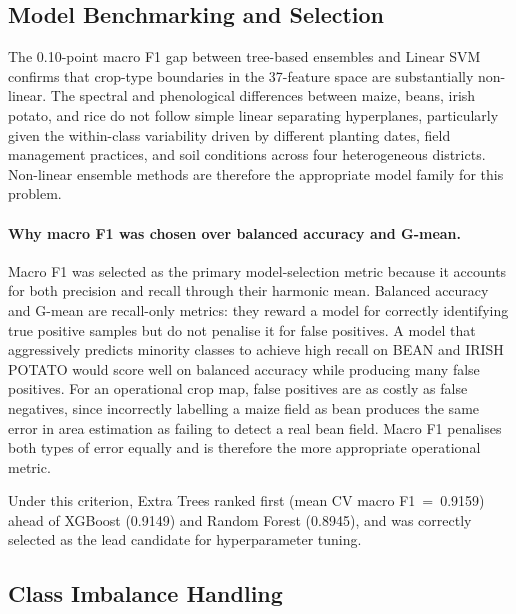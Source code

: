 \subsection{Model Benchmarking and Selection}
\label{subsec:disc_benchmarking}

The 0.10-point macro F1 gap between tree-based ensembles and Linear
SVM confirms that crop-type boundaries in the 37-feature space are
substantially non-linear. The spectral and phenological differences
between maize, beans, irish potato, and rice do not follow simple
linear separating hyperplanes, particularly given the within-class
variability driven by different planting dates, field management
practices, and soil conditions across four heterogeneous districts.
Non-linear ensemble methods are therefore the appropriate model
family for this problem.

\paragraph{Why macro F1 was chosen over balanced accuracy and G-mean.}
Macro F1 was selected as the primary model-selection metric because
it accounts for both precision and recall through their harmonic
mean. Balanced accuracy and G-mean are recall-only metrics: they
reward a model for correctly identifying true positive samples but
do not penalise it for false positives. A model that aggressively
predicts minority classes to achieve high recall on BEAN and IRISH
POTATO would score well on balanced accuracy while producing many
false positives. For an operational crop map, false positives are
as costly as false negatives, since incorrectly labelling a maize field
as bean produces the same error in area estimation as failing to
detect a real bean field. Macro F1 penalises both types of error
equally and is therefore the more appropriate operational metric.

Under this criterion, Extra Trees ranked first (mean CV macro
F1~=~0.9159) ahead of XGBoost (0.9149) and Random Forest (0.8945),
and was correctly selected as the lead candidate for hyperparameter
tuning.


\subsection{Class Imbalance Handling}
\label{subsec:disc_imbalance}

